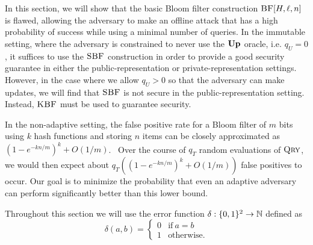 In this section, we will show that the basic Bloom filter construction
$\textnormal{\textsc{BF}}[H,\ell,n]$ is flawed, allowing the adversary to make an offline attack that
has a high probability of success while using a minimal number of queries. In
the immutable setting, where the adversary is constrained to never use the
$\textup{\textbf{Up}}\hspace{0.5pt}$ oracle, i.e. $q_U = 0$, it suffices to use the $\textnormal{\textsc{SBF}}$ construction in
order to provide a good security guarantee in either the public-representation
or private-representation settings. However, in the case where we allow
$q_U > 0$ so that the adversary can make updates, we will find that $\textnormal{\textsc{SBF}}$ is
not secure in the public-representation setting. Instead, $\textnormal{\textsc{KBF}}$ must be used to
guarantee security.


In the non-adaptive setting, the false positive rate for a Bloom filter of $m$
bits using $k$ hash functions and storing $n$ items can be closely approximated
as $(1-e^{-kn/m})^k + O(1/m)$.~\cite{kirsch2006less} Over the course of $q_T$
random evaluations of $\textnormal{\textsc{Qry}}$, we would then expect about
$q_T((1-e^{-kn/m})^k + O(1/m))$ false positives to occur. Our goal is to
minimize the probability that even an adaptive adversary can perform
significantly better than this lower bound.

%
Throughout this section we will use the error function $\delta:\{0,1\}^2\to\mathbb{N}$
defined as
\begin{equation*}
  \delta(a, b) =
  \begin{cases}
    0 & \text{if}\ a=b \\
    1 & \text{otherwise.}
  \end{cases}
\end{equation*}

